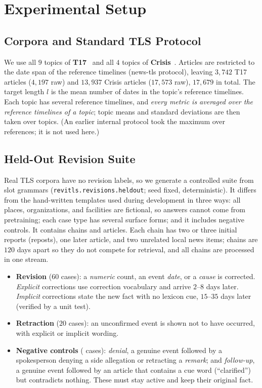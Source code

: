 \documentclass[journal]{IEEEtran}
\begin{document}
\section{Experimental Setup}
\label{sec:experiments}

\subsection{Corpora and Standard TLS Protocol}
\label{subsec:datasets}

We use all $9$ topics of \textbf{T17}~\cite{tran2013leveraging} and all $4$ topics of \textbf{Crisis}~\cite{tran2015timeline}. Articles are restricted to the date span of the reference timelines (news-tls protocol), leaving $3{,}742$ T17 articles ($4{,}197$ raw) and $13{,}937$ Crisis articles ($17{,}573$ raw), $17{,}679$ in total. The target length $l$ is the mean number of dates in the topic's reference timelines. Each topic has several reference timelines, and \emph{every metric is averaged over the reference timelines of a topic}; topic means and standard deviations are then taken over topics. (An earlier internal protocol took the maximum over references; it is not used here.)

\subsection{Held-Out Revision Suite}
\label{subsec:heldout}

Real TLS corpora have no revision labels, so we generate a controlled suite from slot grammars (\texttt{revitls.revisions.heldout}; seed fixed, deterministic). It differs from the hand-written templates used during development in three ways: all places, organizations, and facilities are fictional, so answers cannot come from pretraining; each case type has several surface forms; and it includes negative controls. It contains \HeldN{} chains and \HeldArticles{} articles. Each chain has two or three initial reports (reposts), one later article, and two unrelated local news items; chains are $120$ days apart so they do not compete for retrieval, and all chains are processed in one stream.

\begin{itemize}
    \item \textbf{Revision} ($60$ cases): a \textit{numeric} count, an event \textit{date}, or a \textit{cause} is corrected. \textit{Explicit} corrections use correction vocabulary and arrive $2$--$8$ days later. \textit{Implicit} corrections state the new fact with no lexicon cue, $15$--$35$ days later (verified by a unit test).
    \item \textbf{Retraction} ($20$ cases): an unconfirmed event is shown not to have occurred, with explicit or implicit wording.
    \item \textbf{Negative controls} (\HeldNeg{} cases): \textit{denial}, a genuine event followed by a spokesperson denying a side allegation or retracting a \emph{remark}; and \textit{follow-up}, a genuine event followed by an article that contains a cue word (``clarified'') but contradicts nothing. These must stay active and keep their original fact.
\end{itemize}
\end{document}
